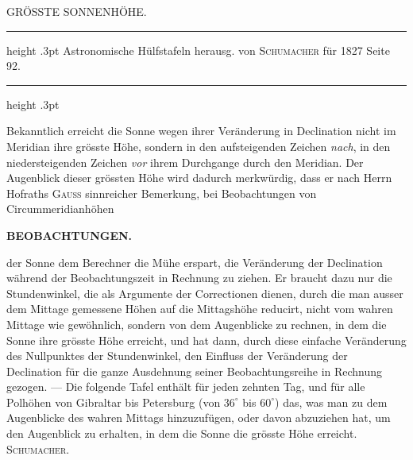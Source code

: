 \par\bigskip
{}
\hypertarget{native-465-sunheight}{}
\begin{center}{\large GRÖSSTE SONNENHÖHE.}\end{center}

\begin{center}
\parbox{.80\linewidth}{%
\centering\small
\hrule height .3pt\relax\vspace{2.5pt}
Astronomische Hülfstafeln herausg. von \textsc{Schumacher} für 1827 Seite 92.\par
\vspace{2.5pt}\hrule height .3pt\relax
}
\end{center}

Bekanntlich erreicht die Sonne wegen ihrer Veränderung in Declination nicht im Meridian ihre grösste Höhe, sondern in den aufsteigenden Zeichen \emph{nach}, in den niedersteigenden Zeichen \emph{vor} ihrem Durchgange durch den Meridian. Der Augenblick dieser grössten Höhe wird dadurch merkwürdig, dass er nach Herrn Hofraths \textsc{Gauss} sinnreicher Bemerkung, bei Beobachtungen von Circummeridianhöhen\par
\clearpage
\thispagestyle{empty}
\noindent{}%
\makebox[12mm][l]{}%
\parbox[t]{\dimexpr\linewidth-24mm\relax}{\centering\footnotesize\bfseries BEOBACHTUNGEN.\par}%
\par\nobreak\medskip
\noindent der Sonne dem Berechner die Mühe erspart, die Veränderung der Declination während der Beobachtungszeit in Rechnung zu ziehen. Er braucht dazu nur die Stundenwinkel, die als Argumente der Correctionen dienen, durch die man ausser dem Mittage gemessene Höhen auf die Mittagshöhe reducirt, nicht vom wahren Mittage wie gewöhnlich, sondern von dem Augenblicke zu rechnen, in dem die Sonne ihre grösste Höhe erreicht, und hat dann, durch diese einfache Veränderung des Nullpunktes der Stundenwinkel, den Einfluss der Veränderung der Declination für die ganze Ausdehnung seiner Beobachtungsreihe in Rechnung gezogen. --- Die folgende Tafel enthält für jeden zehnten Tag, und für alle Polhöhen von Gibraltar bis Petersburg (von $36^\circ$ bis $60^\circ$) das, was man zu dem Augenblicke des wahren Mittags hinzuzufügen, oder davon abzuziehen hat, um den Augenblick zu erhalten, in dem die Sonne die grösste Höhe erreicht. \textsc{Schumacher.}
